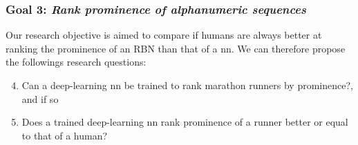 \subsubsection*{Goal 3: \itshape Rank prominence of alphanumeric sequences}

Our research objective is aimed to compare if humans are always better at ranking the prominence of an RBN than that of a \gls{nn}.
We can therefore propose the followings research questions:
\begin{enumerate}[label=\bfseries~RQ\arabic*), leftmargin=2cm, rightmargin=1.5cm]
  \setcounter{enumi}{3}
  \item\label{rq:4} Can a deep-learning \gls{nn} be trained to rank marathon runners by prominence?, and if so
  \item\label{rq:5} Does a trained deep-learning \gls{nn} rank prominence of a runner better or equal to that of a human?
\end{enumerate}

